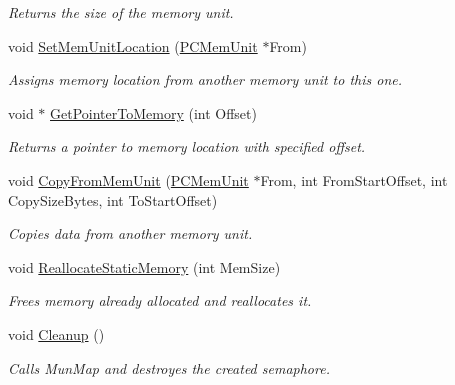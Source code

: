 \begin{DoxyCompactItemize}
\begin{DoxyCompactList}\small\item\em Returns the size of the memory unit. \end{DoxyCompactList}\item 
void \hyperlink{classpc__emulator_1_1PCMemUnit_a9aa9aca9f68e329e45b746247ddc0b39}{Set\+Mem\+Unit\+Location} (\hyperlink{classpc__emulator_1_1PCMemUnit}{P\+C\+Mem\+Unit} $\ast$From)
\begin{DoxyCompactList}\small\item\em Assigns memory location from another memory unit to this one. \end{DoxyCompactList}\item 
void $\ast$ \hyperlink{classpc__emulator_1_1PCMemUnit_a45ccc33e0c33a7680dd53f1e7580f03d}{Get\+Pointer\+To\+Memory} (int Offset)\hypertarget{classpc__emulator_1_1PCMemUnit_a45ccc33e0c33a7680dd53f1e7580f03d}{}\label{classpc__emulator_1_1PCMemUnit_a45ccc33e0c33a7680dd53f1e7580f03d}

\begin{DoxyCompactList}\small\item\em Returns a pointer to memory location with specified offset. \end{DoxyCompactList}\item 
void \hyperlink{classpc__emulator_1_1PCMemUnit_a47afeb8fd963e86394dab636ec525346}{Copy\+From\+Mem\+Unit} (\hyperlink{classpc__emulator_1_1PCMemUnit}{P\+C\+Mem\+Unit} $\ast$From, int From\+Start\+Offset, int Copy\+Size\+Bytes, int To\+Start\+Offset)
\begin{DoxyCompactList}\small\item\em Copies data from another memory unit. \end{DoxyCompactList}\item 
void \hyperlink{classpc__emulator_1_1PCMemUnit_ab7550cf98c33fc7577bd609ce350a739}{Reallocate\+Static\+Memory} (int Mem\+Size)\hypertarget{classpc__emulator_1_1PCMemUnit_ab7550cf98c33fc7577bd609ce350a739}{}\label{classpc__emulator_1_1PCMemUnit_ab7550cf98c33fc7577bd609ce350a739}

\begin{DoxyCompactList}\small\item\em Frees memory already allocated and reallocates it. \end{DoxyCompactList}\item 
void \hyperlink{classpc__emulator_1_1PCMemUnit_acd998eb1872e19b78403f34cc3265781}{Cleanup} ()\hypertarget{classpc__emulator_1_1PCMemUnit_acd998eb1872e19b78403f34cc3265781}{}\label{classpc__emulator_1_1PCMemUnit_acd998eb1872e19b78403f34cc3265781}

\begin{DoxyCompactList}\small\item\em Calls Mun\+Map and destroyes the created semaphore. \end{DoxyCompactList}\end{DoxyCompactItemize}
